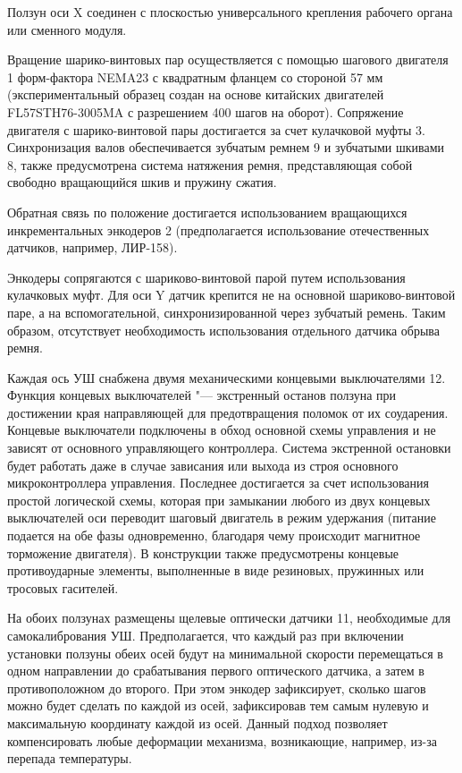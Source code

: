 Ползун оси X соединен с плоскостью универсального крепления рабочего органа или сменного модуля.

Вращение шарико-винтовых пар осуществляется с помощью шагового двигателя 1 форм-фактора NEMA23 с квадратным фланцем со стороной 57 мм (экспериментальный образец создан на основе китайских двигателей FL57STH76-3005MA с разрешением 400 шагов на оборот). Сопряжение двигателя с шарико-винтовой пары достигается за счет кулачковой муфты 3. Синхронизация валов обеспечивается зубчатым ремнем 9 и зубчатыми шкивами 8, также предусмотрена система натяжения ремня, представляющая собой свободно вращающийся шкив и пружину сжатия.

Обратная связь по положение достигается использованием вращающихся инкрементальных энкодеров 2 (предполагается использование отечественных датчиков, например, ЛИР-158).

Энкодеры сопрягаются с шариково-винтовой парой путем использования кулачковых муфт. Для оси Y датчик крепится не на основной шариково-винтовой паре, а на вспомогательной, синхронизированной через зубчатый ремень. Таким образом, отсутствует необходимость использования отдельного датчика обрыва ремня. 

Каждая ось УШ снабжена двумя механическими концевыми выключателями 12. Функция концевых выключателей "--- экстренный останов ползуна при достижении края направляющей для предотвращения поломок от их соударения. Концевые выключатели подключены в обход основной схемы управления и не зависят от основного управляющего контроллера. Система экстренной остановки будет работать даже в случае зависания или выхода из строя основного микроконтроллера управления. Последнее достигается за счет использования простой логической схемы, которая при замыкании любого из двух концевых выключателей оси переводит шаговый двигатель в режим удержания (питание подается на обе фазы одновременно, благодаря чему происходит магнитное торможение двигателя). В конструкции также предусмотрены концевые противоударные элементы, выполненные в виде резиновых, пружинных или тросовых гасителей.

На обоих ползунах размещены щелевые оптически датчики 11, необходимые для самокалибрования УШ. Предполагается, что каждый раз при включении установки ползуны обеих осей будут на минимальной скорости перемещаться в одном направлении до срабатывания первого оптического датчика, а затем в противоположном до второго. При этом энкодер зафиксирует, сколько шагов можно будет сделать по каждой из осей, зафиксировав тем самым нулевую и максимальную координату каждой из осей. Данный подход позволяет компенсировать любые деформации механизма, возникающие, например, из-за перепада температуры.

